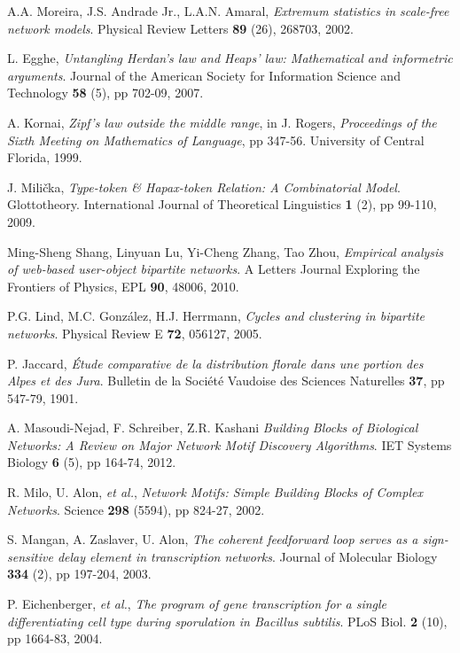 \begin{thebibliography}{99}
  A.A. Moreira, J.S. Andrade Jr., L.A.N. Amaral,
  \emph{Extremum statistics in scale-free network models}.
  Physical Review Letters \textbf{89} (26), 268703,
  2002.
  
  L. Egghe,
  \emph{Untangling Herdan's law and Heaps' law: Mathematical and informetric arguments}.
  Journal of the American Society for Information Science and Technology \textbf{58} (5), pp 702-09,
  2007.

  A. Kornai,
  \emph{Zipf's law outside the middle range}, in J. Rogers, \emph{Proceedings of the Sixth Meeting on Mathematics of Language}, pp 347-56.
  University of Central Florida,
  1999.

  J. Milička,
  \emph{Type-token \& Hapax-token Relation: A Combinatorial Model}.
  Glottotheory. International Journal of Theoretical Linguistics \textbf{1} (2), pp 99-110,
  2009.

  Ming-Sheng Shang, Linyuan Lu, Yi-Cheng Zhang, Tao Zhou,
  \emph{Empirical analysis of web-based user-object bipartite networks}.
  A Letters Journal Exploring the Frontiers of Physics, EPL \textbf{90}, 48006,
  2010.

  P.G. Lind, M.C. González, H.J. Herrmann,
  \emph{Cycles and clustering in bipartite networks}.
  Physical Review E \textbf{72}, 056127,
  2005.

  P. Jaccard,
  \emph{Étude comparative de la distribution florale dans une portion des Alpes et des Jura}.
  Bulletin de la Société Vaudoise des Sciences Naturelles \textbf{37}, pp 547-79,
  1901.

  A. Masoudi-Nejad, F. Schreiber, Z.R. Kashani
  \emph{Building Blocks of Biological Networks: A Review on Major Network Motif Discovery Algorithms}.
  IET Systems Biology \textbf{6} (5), pp 164-74,
  2012.

  R. Milo, U. Alon, \emph{et al.},
  \emph{Network Motifs: Simple Building Blocks of Complex Networks}.
  Science \textbf{298} (5594), pp 824-27,
  2002.

  S. Mangan, A. Zaslaver, U. Alon,
  \emph{The coherent feedforward loop serves as a sign-sensitive delay element in transcription networks}.
  Journal of Molecular Biology \textbf{334} (2), pp 197-204,
  2003.

  P. Eichenberger, \emph{et al.},
  \emph{The program of gene transcription for a single differentiating cell type during sporulation in Bacillus subtilis}.
  PLoS Biol. \textbf{2} (10), pp 1664-83,
  2004.


\end{thebibliography}
